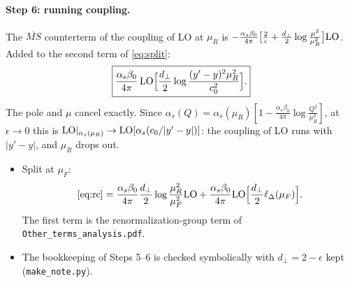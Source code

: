 \documentclass[10pt]{article}
\numberwithin{equation}{section}
\newcommand{\LO}{{\rm LO}}
\begin{document}
\paragraph{Step 6: running coupling.} The $\overline{MS}$ counterterm of the coupling of LO at $\mu_R$ is $-\frac{\alpha_s\beta_0}{4\pi}\big[\frac2\epsilon+\frac{d_\perp}{2}\log\frac{\mu^2}{\mu_R^2}\big]\LO$. Added to the second term of \eqref{eq:split}:
\begin{equation}
\boxed{\frac{\alpha_s\beta_0}{4\pi}\,\LO\Big[\frac{d_\perp}{2}\log\frac{(y'-y)^2\mu_R^2}{c_0^2}\Big].}\label{eq:rc}
\end{equation}
The pole and $\mu$ cancel exactly. Since $\alpha_s(Q)=\alpha_s(\mu_R)[1-\frac{\alpha_s\beta_0}{4\pi}\log\frac{Q^2}{\mu_R^2}]$, at $\epsilon\to0$ this is $\LO|_{\alpha_s(\mu_R)}\to\LO[\alpha_s(c_0/|y'-y|)]$: the coupling of LO runs with $|y'-y|$, and $\mu_R$ drops out.
\begin{itemize}
\item Split at $\mu_F$:\vspace{-1ex}\begin{equation*}\eqref{eq:rc}=\frac{\alpha_s\beta_0}{4\pi}\frac{d_\perp}{2}\log\frac{\mu_R^2}{\mu_F^2}\LO+\frac{\alpha_s\beta_0}{4\pi}\LO\Big[\frac{d_\perp}{2}\ell_\Delta(\mu_F)\Big].\end{equation*}The first term is the renormalization-group term of \texttt{Other\_terms\_analysis.pdf}.
\item The bookkeeping of Steps 5--6 is checked symbolically with $d_\perp=2-\epsilon$ kept (\texttt{make\_note.py}).
\end{itemize}
\end{document}
